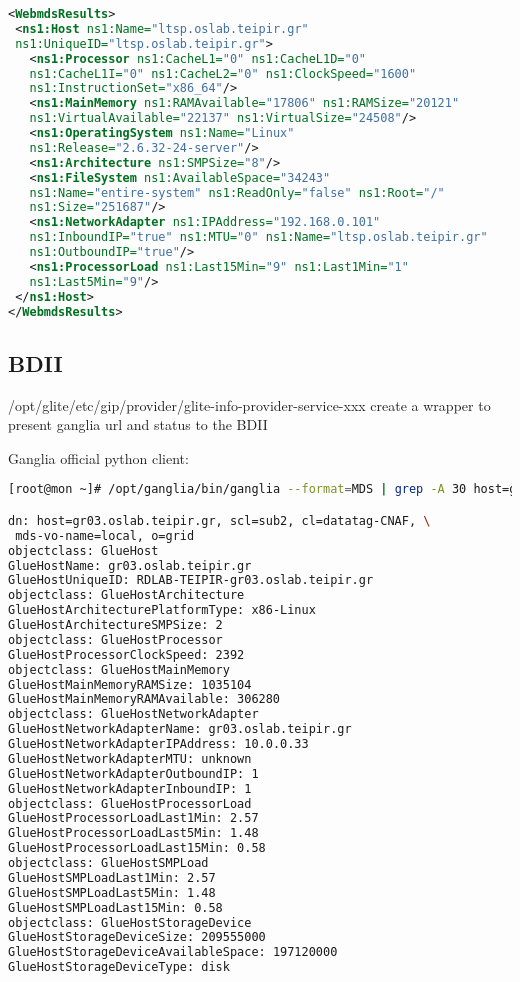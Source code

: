 \begin{lstlisting}[language=XML,caption=WebMDS results from XPath query,label=xpath_result]
<WebmdsResults>
 <ns1:Host ns1:Name="ltsp.oslab.teipir.gr" 
 ns1:UniqueID="ltsp.oslab.teipir.gr">
   <ns1:Processor ns1:CacheL1="0" ns1:CacheL1D="0" 
   ns1:CacheL1I="0" ns1:CacheL2="0" ns1:ClockSpeed="1600" 
   ns1:InstructionSet="x86_64"/>
   <ns1:MainMemory ns1:RAMAvailable="17806" ns1:RAMSize="20121" 
   ns1:VirtualAvailable="22137" ns1:VirtualSize="24508"/>
   <ns1:OperatingSystem ns1:Name="Linux" 
   ns1:Release="2.6.32-24-server"/>
   <ns1:Architecture ns1:SMPSize="8"/>
   <ns1:FileSystem ns1:AvailableSpace="34243" 
   ns1:Name="entire-system" ns1:ReadOnly="false" ns1:Root="/" 
   ns1:Size="251687"/>
   <ns1:NetworkAdapter ns1:IPAddress="192.168.0.101" 
   ns1:InboundIP="true" ns1:MTU="0" ns1:Name="ltsp.oslab.teipir.gr" 
   ns1:OutboundIP="true"/>
   <ns1:ProcessorLoad ns1:Last15Min="9" ns1:Last1Min="1" 
   ns1:Last5Min="9"/>
 </ns1:Host>
</WebmdsResults>
\end{lstlisting}

\subsection{BDII}
/opt/glite/etc/gip/provider/glite-info-provider-service-xxx
create a wrapper to present ganglia url and status to the BDII

Ganglia official python client:
\begin{lstlisting}[language=bash,caption=Python Ganglia client MDS export]
[root@mon ~]# /opt/ganglia/bin/ganglia --format=MDS | grep -A 30 host=gr03

dn: host=gr03.oslab.teipir.gr, scl=sub2, cl=datatag-CNAF, \
 mds-vo-name=local, o=grid
objectclass: GlueHost
GlueHostName: gr03.oslab.teipir.gr
GlueHostUniqueID: RDLAB-TEIPIR-gr03.oslab.teipir.gr
objectclass: GlueHostArchitecture
GlueHostArchitecturePlatformType: x86-Linux
GlueHostArchitectureSMPSize: 2
objectclass: GlueHostProcessor
GlueHostProcessorClockSpeed: 2392
objectclass: GlueHostMainMemory
GlueHostMainMemoryRAMSize: 1035104
GlueHostMainMemoryRAMAvailable: 306280
objectclass: GlueHostNetworkAdapter
GlueHostNetworkAdapterName: gr03.oslab.teipir.gr
GlueHostNetworkAdapterIPAddress: 10.0.0.33
GlueHostNetworkAdapterMTU: unknown
GlueHostNetworkAdapterOutboundIP: 1
GlueHostNetworkAdapterInboundIP: 1
objectclass: GlueHostProcessorLoad
GlueHostProcessorLoadLast1Min: 2.57
GlueHostProcessorLoadLast5Min: 1.48
GlueHostProcessorLoadLast15Min: 0.58
objectclass: GlueHostSMPLoad
GlueHostSMPLoadLast1Min: 2.57
GlueHostSMPLoadLast5Min: 1.48
GlueHostSMPLoadLast15Min: 0.58
objectclass: GlueHostStorageDevice
GlueHostStorageDeviceSize: 209555000
GlueHostStorageDeviceAvailableSpace: 197120000
GlueHostStorageDeviceType: disk
\end{lstlisting}

